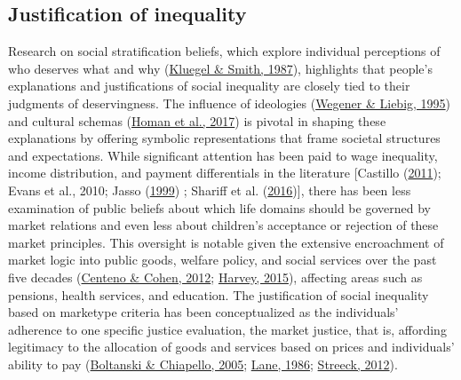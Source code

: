 \documentclass[
  letterpaper,
  DIV=11,
  numbers=noendperiod]{scrartcl}
\begin{document}
\hypertarget{justification-of-inequality}{%
\subsection{Justification of
inequality}\label{justification-of-inequality}}

Research on social stratification beliefs, which explore individual
perceptions of who deserves what and why
(\protect\hyperlink{ref-kluegel_beliefs_1987}{Kluegel \& Smith, 1987}),
highlights that people's explanations and justifications of social
inequality are closely tied to their judgments of deservingness. The
influence of ideologies
(\protect\hyperlink{ref-wegener_dominant_1995}{Wegener \& Liebig, 1995})
and cultural schemas (\protect\hyperlink{ref-homan_being_2017}{Homan et
al., 2017}) is pivotal in shaping these explanations by offering
symbolic representations that frame societal structures and
expectations. While significant attention has been paid to wage
inequality, income distribution, and payment differentials in the
literature {[}Castillo
(\protect\hyperlink{ref-castillo_legitimacy_2011}{2011}); Evans et al.,
2010; Jasso (\protect\hyperlink{ref-jasso_how_1999}{1999}) ; Shariff et
al. (\protect\hyperlink{ref-shariff_income_2016}{2016}){]}, there has
been less examination of public beliefs about which life domains should
be governed by market relations and even less about children's
acceptance or rejection of these market principles. This oversight is
notable given the extensive encroachment of market logic into public
goods, welfare policy, and social services over the past five decades
(\protect\hyperlink{ref-centeno_arc_2012}{Centeno \& Cohen, 2012};
\protect\hyperlink{ref-harvey_breve_2015}{Harvey, 2015}), affecting
areas such as pensions, health services, and education. The
justification of social inequality based on marketype criteria has been
conceptualized as the individuals' adherence to one specific justice
evaluation, the market justice, that is, affording legitimacy to the
allocation of goods and services based on prices and individuals'
ability to pay (\protect\hyperlink{ref-boltanski_new_2005}{Boltanski \&
Chiapello, 2005}; \protect\hyperlink{ref-lane_market_1986}{Lane, 1986};
\protect\hyperlink{ref-streeck_citizens_2012}{Streeck, 2012}).
\end{document}

